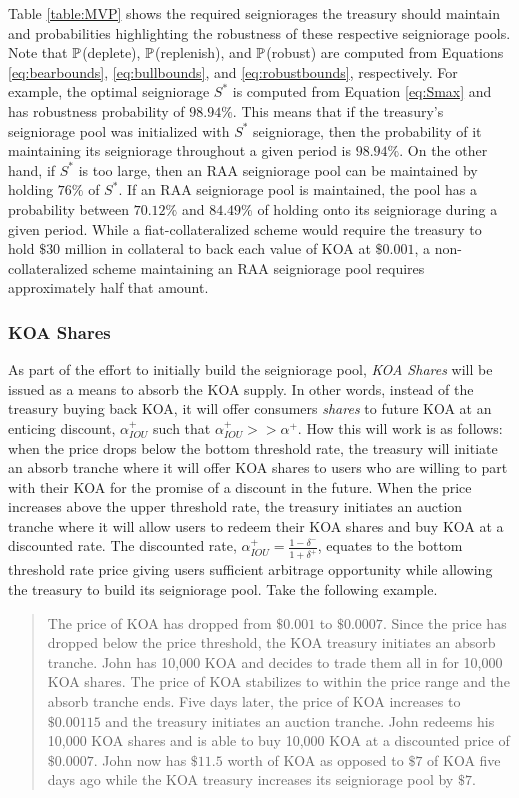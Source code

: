 Table \ref{table:MVP} shows the required seigniorages the treasury should maintain and probabilities highlighting the robustness of these respective seigniorage pools. Note that $\mathbb{P}$(deplete), $\mathbb{P}$(replenish), and $\mathbb{P}$(robust) are computed from Equations \ref{eq:bearbounds}, \ref{eq:bullbounds}, and \ref{eq:robustbounds}, respectively. For example, the optimal seigniorage $S^*$ is computed from Equation \ref{eq:Smax} and has robustness probability of $98.94\%$. This means that if the treasury's seigniorage pool was initialized with $S^*$ seigniorage, then the probability of it maintaining its seigniorage throughout a given period is $98.94\%$. On the other hand, if $S^*$ is too large, then an RAA seigniorage pool can be maintained by holding $76\%$ of $S^*$. If an RAA seigniorage pool is maintained, the pool has a probability between $70.12\%$ and $84.49\%$ of holding onto its seigniorage during a given period. While a fiat-collateralized scheme would require the treasury to hold $\$30$ million in collateral to back each value of KOA at $\$0.001$, a non-collateralized scheme maintaining an RAA seigniorage pool requires approximately half that amount.

\subsubsection{KOA Shares}

As part of the effort to initially build the seigniorage pool, \textit{KOA Shares} will be issued as a means to absorb the KOA supply. In other words, instead of the treasury buying back KOA, it will offer consumers \textit{shares} to future KOA at an enticing discount, $\alpha^+_{IOU}$ such that $\alpha^+_{IOU} >> \alpha^+$. How this will work is as follows: when the price drops below the bottom threshold rate, the treasury will initiate an absorb tranche where it will offer KOA shares to users who are willing to part with their KOA for the promise of a discount in the future. When the price increases above the upper threshold rate, the treasury initiates an auction tranche where it will allow users to redeem their KOA shares and buy KOA at a discounted rate. The discounted rate, $\alpha^+_{IOU} = \frac{1 - \delta^-}{1+\delta^+}$, equates to the bottom threshold rate price giving users sufficient arbitrage opportunity while allowing the treasury to build its seigniorage pool. Take the following example.
%
\begin{quote}
The price of KOA has dropped from $\$0.001$ to $\$0.0007$. Since the price has dropped below the price threshold, the KOA treasury initiates an absorb tranche. John has 10,000 KOA and decides to trade them all in for 10,000 KOA shares. The price of KOA stabilizes to within the price range and the absorb tranche ends. Five days later, the price of KOA increases to $\$0.00115$ and the treasury initiates an auction tranche. John redeems his 10,000 KOA shares and is able to buy 10,000 KOA at a discounted price of $\$0.0007$. John now has $\$11.5$ worth of KOA as opposed to $\$7$ of KOA five days ago while the KOA treasury increases its seigniorage pool by $\$7$.
\end{quote}

